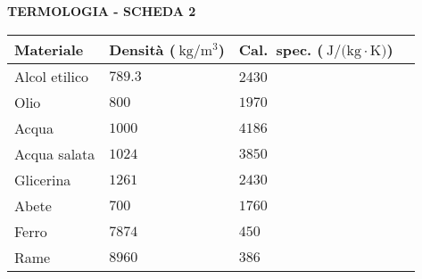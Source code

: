 
\begin{center}
    \textbf{\Large \sffamily TERMOLOGIA - SCHEDA 2}
\end{center}\vspace{\baselineskip}

\noindent
\centering\begin{tabular}{llll}
    \textbf{Materiale}  & \textbf{Densità}  ($\SI{}{\kilogram/\meter^3}$)  & \textbf{Cal.\ spec.} ($\SI{}{\joule/(\kilogram\cdot\kelvin})$) \\ \hline
    Alcol etilico & $\num{789.3}$ & \num{2430}\\ \hline
    Olio & $\num{800}$ & $\num{1970}$\\ \hline
    Acqua & $\num{1000}$ & $\num{4186}$\\ \hline
    Acqua salata & $\num{1024}$ & $\num{3850}$ \\ \hline
    Glicerina & $\num{1261}$ & $\num{2430}$\\ \hline
    Abete & $\num{700}$ & $\num{1760}$\\ \hline
    Ferro & $\num{7874}$ & $\num{450}$\\ \hline
    Rame & $\num{8960}$ & $\num{386}$\\ \hline
\end{tabular}



